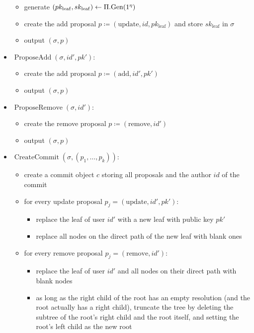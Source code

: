\begin{definition}
\begin{itemize}
		      \begin{itemize}
			      \item generate $(pk_{\mathrm{leaf}}, sk_{\mathrm{leaf}}) \leftarrow \Pi.\mathrm{Gen}(1^\eta)$
			      \item create the add proposal $p \coloneqq (\mathrm{update}, id, pk_{\mathrm{leaf}})$ and store $sk_{\mathrm{leaf}}$ in $\sigma$
			      \item output $(\sigma, p)$
		      \end{itemize}
		\item $\operatorname{ProposeAdd}(\sigma, id', pk')$:
		      \begin{itemize}
			      \item create the add proposal $p \coloneqq (\mathrm{add}, id', pk')$
			      \item output $(\sigma, p)$
		      \end{itemize}
		\item $\operatorname{ProposeRemove}(\sigma, id')$:
		      \begin{itemize}
			      \item create the remove proposal $p \coloneqq (\mathrm{remove}, id')$
			      \item output $(\sigma, p)$
		      \end{itemize}
		\item $\operatorname{CreateCommit}(\sigma, (p_1, \ldots, p_k))$:
		      \begin{itemize}
			      \item create a commit object $c$ storing all proposals and the author $id$ of the commit
			      \item for every update proposal $p_j = (\mathrm{update}, id', pk')$:
			            \begin{itemize}
				            \item replace the leaf of user $id'$ with a new leaf with public key $pk'$
				            \item replace all nodes on the direct path of the new leaf with blank ones
			            \end{itemize}
			      \item for every remove proposal $p_j = (\mathrm{remove}, id')$:
			            \begin{itemize}
				            \item replace the leaf of user $id'$ and all nodes on their direct path with blank nodes
				            \item as long as the right child of the root has an empty resolution (and the root actually has a right child), truncate the tree by deleting the subtree of the root's right child and the root itself, and setting the root's left child as the new root

\end{itemize}
\end{itemize}
\end{itemize}
\end{definition}
